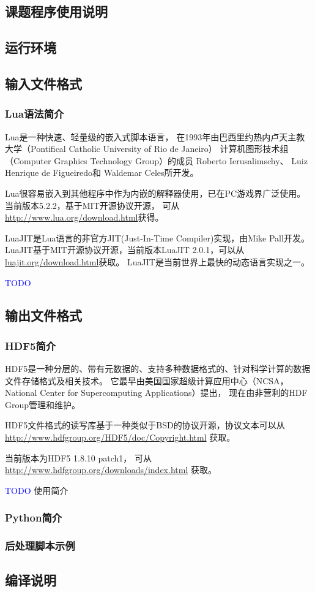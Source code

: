 \documentclass[master,xetex]{thuthesis}
\newcommand{\TODO}{ \textcolor{blue}{TODO} }
\begin{document}
\begin{appendix}

\chapter{课题程序使用说明}
\section{运行环境}
\section{输入文件格式}
\subsection{Lua语法简介}

Lua是一种快速、轻量级的嵌入式脚本语言，
在1993年由巴西里约热内卢天主教大学（Pontifical Catholic University of Rio de Janeiro）
计算机图形技术组（Computer Graphics Technology Group）的成员
Roberto Ierusalimschy、 Luiz Henrique de Figueiredo和 Waldemar Celes所开发。

Lua很容易嵌入到其他程序中作为内嵌的解释器使用，已在PC游戏界广泛使用。
当前版本5.2.2，基于MIT开源协议开源，
可从 \url{http://www.lua.org/download.html}获得。

LuaJIT是Lua语言的非官方JIT(Just-In-Time Compiler)实现，由Mike Pall开发。
LuaJIT基于MIT开源协议开源，当前版本LuaJIT 2.0.1，可以从\url{luajit.org/download.html}获取。
LuaJIT是当前世界上最快的动态语言实现之一。\cite{LuaJITHomepage}

\TODO

\section{输出文件格式}
\subsection{HDF5简介}

HDF5是一种分层的、带有元数据的、支持多种数据格式的、针对科学计算的数据文件存储格式及相关技术。
它最早由美国国家超级计算应用中心（NCSA， 
National Center for Supercomputing Applications）提出，
现在由非营利的HDF Group管理和维护。

HDF5文件格式的读写库基于一种类似于BSD的协议开源，协议文本可以从
\url{http://www.hdfgroup.org/HDF5/doc/Copyright.html} 获取。

当前版本为HDF5 1.8.10 patch1，
可从\url{http://www.hdfgroup.org/downloads/index.html} 获取。

\TODO 使用简介

\subsection{Python简介}
\subsection{后处理脚本示例}
\section{编译说明}

%

%
%
\end{appendix}

%
\end{document}
